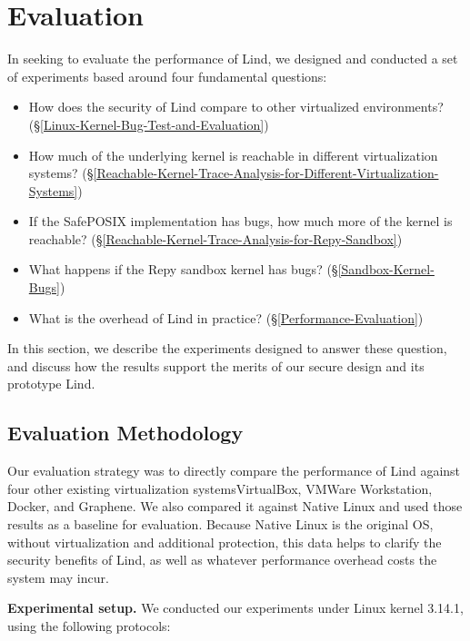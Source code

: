 \section{Evaluation}
\label{sec.evaluation}

In seeking to evaluate the performance of Lind, 
we designed and conducted a set of experiments based around four
fundamental 
questions:

\begin{itemize}
\item How does the security of Lind compare to other virtualized environments?
(\S{\ref{Linux-Kernel-Bug-Test-and-Evaluation}})

\item How much of the underlying kernel is reachable in different
virtualization systems?
(\S{\ref{Reachable-Kernel-Trace-Analysis-for-Different-Virtualization-Systems}})

\item If the SafePOSIX implementation has bugs, how much more of the kernel is
reachable?
(\S{\ref{Reachable-Kernel-Trace-Analysis-for-Repy-Sandbox}})

\item What happens if the Repy sandbox kernel has bugs?
(\S{\ref{Sandbox-Kernel-Bugs}})

\item What is the overhead of Lind in practice?
(\S{\ref{Performance-Evaluation}})
\end{itemize}

In this section, we describe the experiments designed to answer these
question, 
and discuss how the results support the merits of our secure design and its
prototype Lind. 

\subsection{Evaluation Methodology}

Our evaluation strategy was to directly compare the performance of Lind
against 
four other existing virtualization systems\textendash VirtualBox, VMWare
Workstation, 
Docker, and Graphene. We also compared it against Native Linux and used 
those results as a baseline for evaluation. Because Native Linux is the
original OS, 
without virtualization and additional protection, this data helps to
clarify the security benefits of Lind, 
as well as whatever performance overhead costs the system may incur.

\textbf{Experimental setup.}
We conducted our experiments under Linux kernel 3.14.1, using the following
protocols:

